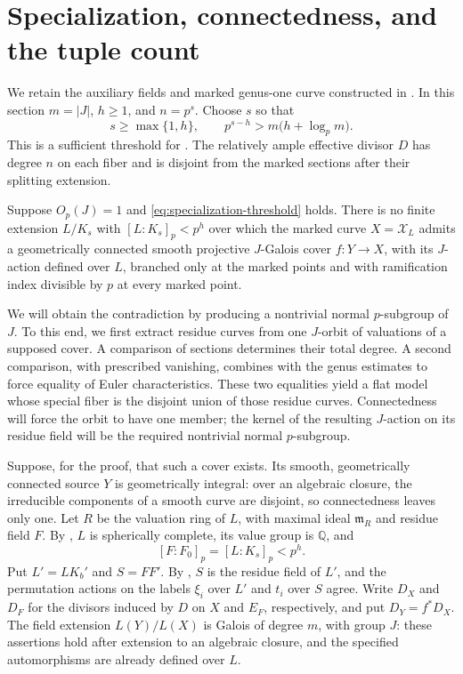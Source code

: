 \section{Specialization, connectedness, and the tuple count}\label{sec:specialization}

We retain the auxiliary fields and marked genus-one curve constructed in
. In this section $m=|J|$, $h\geq1$,
and $n=p^s$. Choose $s$ so that
\begin{equation}\label{eq:specialization-threshold}
 s\geq\max\{1,h\},\qquad
 p^{s-h}>m\bigl(h+\log_p m\bigr).
\end{equation}
This is a sufficient threshold for .
The relatively ample effective divisor $D$ has degree $n$ on each fiber
and is disjoint from the marked sections after their splitting extension.

\begin{proposition}\label{prop:no-small-cover}
Suppose $O_p(J)=1$ and \eqref{eq:specialization-threshold} holds. There is no
finite extension $L/K_s$ with $[L:K_s]_p<p^h$ over which the marked curve
$X=\mathcal X_L$ admits a geometrically connected smooth projective
$J$-Galois cover $f:Y\to X$, with its $J$-action defined over $L$, branched
only at the marked points and with ramification index divisible by $p$ at
every marked point.
\end{proposition}

We will obtain the contradiction by producing a nontrivial normal
$p$-subgroup of $J$. To this end, we first extract residue curves from
one $J$-orbit of valuations of a supposed cover. A comparison of
sections determines their total degree. A second comparison, with
prescribed vanishing, combines with the genus estimates to force
equality of Euler characteristics. These two equalities yield a flat
model whose special fiber is the disjoint union of those residue curves.
Connectedness will force the orbit to have one member; the kernel of
the resulting $J$-action on its residue field will be the required
nontrivial normal $p$-subgroup.

Suppose, for the proof, that such a cover exists. Its smooth,
geometrically connected source $Y$ is geometrically integral: over an
algebraic closure, the irreducible components of a smooth curve are
disjoint, so connectedness leaves only one. Let $R$ be the valuation
ring of $L$, with maximal ideal $\mathfrak m_R$ and residue field $F$.
By , $L$ is spherically complete, its value group
is $\mathbb Q$, and
\[
 [F:F_0]_p=[L:K_s]_p<p^h.
\]
Put $L'=LK_b'$ and $S=FF'$. By , $S$ is the
residue field of $L'$, and the permutation actions on the labels $\xi_i$
over $L'$ and $t_i$ over $S$ agree. Write $D_X$ and $D_F$ for the divisors
induced by $D$ on $X$ and $E_F$, respectively, and put $D_Y=f^*D_X$.
The field extension $L(Y)/L(X)$ is Galois of degree $m$, with group $J$:
these assertions hold after extension to an algebraic closure, and the
specified automorphisms are already defined over $L$.

